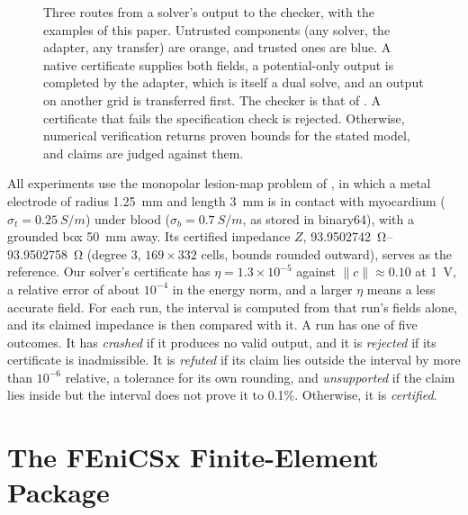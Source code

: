 \documentclass[11pt]{article}
\begin{document}
\begin{figure}[t]
\caption{Three routes from a solver's output to the checker, with the examples of
this paper. Untrusted components (any solver, the adapter, any transfer) are orange,
and trusted ones are blue. A native certificate supplies both fields, a
potential-only output is completed by the adapter, which is itself a dual solve, and
an output on another grid is transferred first. The checker is that of
\cite{dovelos2026}. A certificate that fails the specification check is rejected.
Otherwise, numerical verification returns proven bounds for the stated model, and
claims are judged against them.}
\label{fig:process}
\end{figure}

All experiments use the monopolar lesion-map problem of \cite{dovelos2026}, in
which a metal electrode of radius \SI{1.25}{mm} and length \SI{3}{mm} is in contact
with myocardium ($\sigma_t=\SI{0.25}{S/m}$) under blood ($\sigma_b=\SI{0.7}{S/m}$, as
stored in binary64), with a grounded box \SI{50}{mm} away. Its certified impedance $Z$,
\SIrange{93.9502742}{93.9502758}{\ohm} (degree 3, $169\times332$ cells, bounds
rounded outward), serves as the reference. Our solver's certificate has
$\eta=1.3\times10^{-5}$ against $\lVert c\rVert\approx0.10$ at \SI{1}{V}, a relative
error of about $10^{-4}$ in the energy norm, and a larger $\eta$ means a less accurate field. For each run, the interval is computed
from that run's fields alone, and its claimed impedance is then compared with it. A
run has one of five outcomes. It has \emph{crashed} if it produces no valid output,
and it is \emph{rejected} if its certificate is inadmissible. It is \emph{refuted} if
its claim lies outside the interval by more than $10^{-6}$ relative, a tolerance for
its own rounding, and \emph{unsupported} if the claim lies inside but the interval
does not prove it to 0.1\%. Otherwise, it is \emph{certified}.

\section{The FEniCSx Finite-Element Package}\label{sec:e1}
\end{document}
